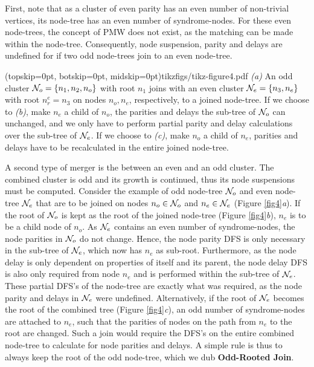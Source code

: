 First, note that as a cluster of even parity has an even number of non-trivial vertices, its node-tree has an even number of syndrome-nodes. For these even node-trees, the concept of PMW does not exist, as the matching can be made within the node-tree. Consequently, node suspension, parity and delays are undefined for if two odd node-trees join to an even node-tree. 

\Figure[hbt](topskip=0pt, botskip=0pt, midskip=0pt){tikzfigs/tikz-figure4.pdf}{
    \emph{(a)} An odd cluster $\mathcal{N}_o=\{n_1, n_2, n_o\}$ with root $n_1$ joins with an even cluster $\mathcal{N}_e=\{n_3, n_e\}$ with root $n^e_r=n_3$ on nodes $n_o, n_e$, respectively, to a joined node-tree. If we choose to \emph{(b)}, make $n_e$ a child of $n_o$, the parities and delays the sub-tree of $\mathcal{N}_o$ can unchanged, and we only have to perform partial parity and delay calculations over the sub-tree of $\mathcal{N}_e$. If we choose to \emph{(c)}, make $n_o$ a child of $n_e$, parities and delays have to be recalculated in the entire joined node-tree. \label{fig4}}

A second type of merger is the between an even and an odd cluster. The combined cluster is odd and its growth is continued, thus its node suspensions must be computed. Consider the example of odd node-tree $\mathcal{N}_o$ and even node-tree $\mathcal{N}_e$ that are to be joined on nodes $n_o\in \mathcal{N}_o$ and $n_e \in \mathcal{N}_e$ (Figure \ref{fig4}\emph{a}). If the root of $\mathcal{N}_o$ is kept as the root of the joined node-tree (Figure \ref{fig4}\emph{b}), $n_e$ is to be a child node of $n_o$. As $\mathcal{N}_e$ contains an even number of syndrome-nodes, the node parities in $\mathcal{N}_o$ do not change. Hence, the node parity DFS is only necessary in the sub-tree of $\mathcal{N}_e$, which now has $n_e$ as sub-root. Furthermore, as the node delay is only dependent on properties of itself and its parent, the node delay DFS is also only required from node $n_e$ and is performed within the sub-tree of $\mathcal{N}_e$. These partial DFS's of the node-tree are exactly what was required, as the node parity and delays in $\mathcal{N}_e$ were undefined. Alternatively, if the root of $\mathcal{N}_e$ becomes the root of the combined tree (Figure \ref{fig4}\emph{c}), an odd number of syndrome-nodes are attached to $n_e$, such that the parities of nodes on the path from $n_e$ to the root are changed. Such a join would require the DFS's on the entire combined node-tree to calculate for node parities and delays. A simple rule is thus to always keep the root of the odd node-tree, which we dub \textbf{Odd-Rooted Join}.

